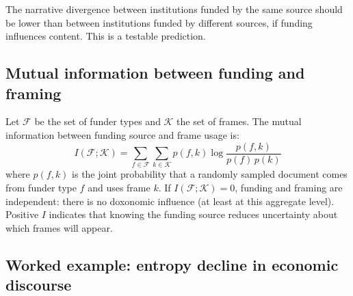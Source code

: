 The narrative divergence between institutions funded by the same source should be lower than between institutions funded by different sources, if funding influences content.
This is a testable prediction.

\subsection{Mutual information between funding and framing}

\begin{definition}
\label{def:doxo-mi}
Let $\mathcal{F}$ be the set of funder types and $\mathcal{K}$ the set of frames.
The mutual information between funding source and frame usage is:
\[
  I(\mathcal{F}; \mathcal{K}) = \sum_{f \in \mathcal{F}} \sum_{k \in \mathcal{K}} p(f, k) \log \frac{p(f, k)}{p(f) \, p(k)}
\]
where $p(f, k)$ is the joint probability that a randomly sampled document comes from funder type $f$ and uses frame $k$.
If $I(\mathcal{F}; \mathcal{K}) = 0$, funding and framing are independent: there is no doxonomic influence (at least at this aggregate level).
Positive $I$ indicates that knowing the funding source reduces uncertainty about which frames will appear.
\end{definition}

\subsection{Worked example: entropy decline in economic discourse}

